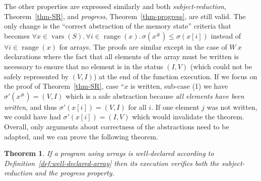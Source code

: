 \documentclass[preprint,12pt]{elsarticle}
\DeclareMathOperator{\vars}{vars}
\newtheorem{Theorem}{Theorem}
\newcommand{\abs}[1]{#1^\#}
\DeclareMathOperator{\range}{range}
\begin{document}
The other properties are expressed similarly and both \emph{subject-reduction}, 
Theorem~\ref{thm-SR}, and \emph{progress}, Theorem~\ref{thm-progress}, are 
still valid. The only change is the ``correct abstraction of the memory state'' criteria 
that becomes $\forall x\in 
\vars(S).\,\forall i\in\range(x).\, \sigma(\abs x)\leq\sigma(x[i])$ instead of $\forall 
i\in\range(x)$ for arrays. The proofs are similar except in the case of $W~x$ 
declarations where the fact that all elements of the array must be written is necessary 
to ensure that no element is in the status $(I,V)$ (which could not be safely represented 
by $(V,I)$) at the end of the function execution. If we focus on the proof of 
Theorem~\ref{thm-SR}, case ``$x$ is written, sub-case (1) we have $\sigma'(\abs x)=(V,I)$ 
which is a safe abstraction because \emph{all elements have been written}, and thus 
$\sigma'(x[i])=(V,I)$ for all $i$. If one element $j$ was not written, we could have had 
$\sigma'(x[i])=(I,V)$ which would invalidate the theorem. Overall, only arguments about correctness of the abstractions need to be adapted, and we can prove the following theorem.
%
%
\begin{Theorem}\label{thm-correct-array}
If a program using arrays is well-declared according to Definition~\ref{def:well-declared-array} then its execution verifies both the subject-reduction and the progress property.
\end{Theorem}
\end{document}
